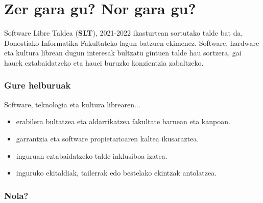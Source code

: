\documentclass[]{report}
\begin{document}




\newpage
\section*{Zer gara gu? Nor gara gu?}

%
Software Libre Taldea (\textbf{SLT}), 2021-2022 ikasturtean sortutako talde bat da, Donostiako Informatika Fakultateko lagun batzuen ekimenez. Software, hardware eta kultura librean dugun interesak bultzatu gintuen talde hau sortzera, gai hauek eztabaidatzeko eta hauei buruzko konzientzia zabaltzeko. 
\vspace{-3mm}

\subsubsection*{Gure helburuak}

\noindent Software, teknologia eta kultura librearen...
\begin{itemize}
    \item erabilera bultatzea eta aldarrikatzea fakultate barnean eta kanpoan.
    \item garrantzia eta software propietarioaren kaltea ikusaraztea.
    \item inguruan eztabaidatzeko talde inklusiboa izatea.
    \item inguruko ekitaldiak, tailerrak edo bestelako ekintzak antolatzea.
\end{itemize}


\subsubsection*{Nola?}
\end{document}
